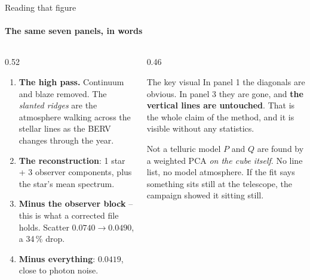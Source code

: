 \documentclass[aspectratio=169,11pt]{beamer}
\begin{document}
\begin{frame}{Reading that figure}
  \framesubtitle{The same seven panels, in words}

  \begin{columns}[T]
    \begin{column}{0.52\textwidth}
      \begin{enumerate}\small
        \item \textbf{The high pass.} Continuum and blaze removed. The
          \emph{slanted ridges} are the atmosphere walking across the stellar
          lines as the BERV changes through the year.
        \item \textbf{The reconstruction}: 1 star + 3 observer components,
          plus the star's mean spectrum.
        \item \textbf{Minus the observer block} -- this is what a corrected
          file holds. Scatter $0.0740 \to 0.0490$, a \textcolor{good}{34\,\%
          drop}.
        \item[5.] \textbf{Minus everything}: $0.0419$, close to photon noise.
      \end{enumerate}
    \end{column}
    \begin{column}{0.46\textwidth}
      \begin{block}{\small The key visual}
        \small
        In panel 1 the diagonals are obvious. In panel 3 they are gone, and
        \textbf{the vertical lines are untouched}. That is the whole claim of
        the method, and it is visible without any statistics.
      \end{block}

      \vspace{0.5em}
      \begin{alertblock}{\small Not a telluric model}
        \small
        $P$ and $Q$ are found by a weighted PCA \emph{on the cube itself}.
        No line list, no model atmosphere. If the fit says something sits
        still at the telescope, the campaign showed it sitting still.
      \end{alertblock}
    \end{column}
  \end{columns}
\end{frame}
\end{document}
